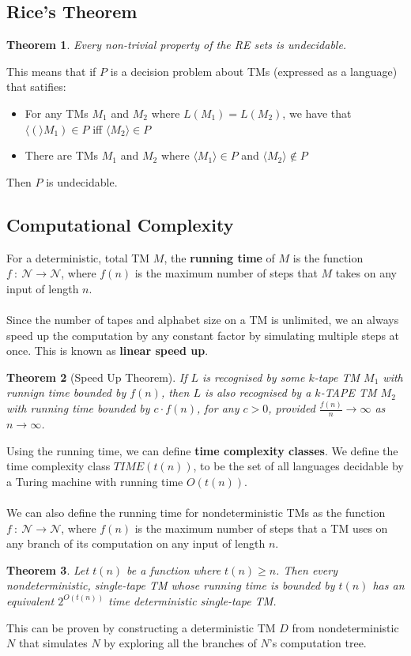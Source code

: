 \documentclass{article}
\newtheorem{thm}{Theorem}
\newcommand{\encode}[1]{\langle #1 \rangle}
\begin{document}
    \subsection{Rice's Theorem}
        \begin{thm}
            Every non-trivial property of the RE sets is undecidable.
        \end{thm}
        This means that if $P$ is a decision problem about TMs (expressed as a language) that satifies:
        \begin{itemize}
            \item For any TMs $M_1$ and $M_2$ where $L(M_1) = L(M_2)$, we have that $\encode(M_1) \in P$ iff $\encode{M_2} \in P$
            \item There are TMs $M_1$ and $M_2$ where $\encode{M_1} \in P$ and $\encode{M_2} \notin P$
        \end{itemize}
        Then $P$ is undecidable.
    \subsection{Computational Complexity}
        For a deterministic, total TM $M$, the \textbf{running time} of $M$ is the function $f \ : \ \mathcal{N} \to \mathcal{N}$, where $f(n)$ is the maximum number of steps that $M$ takes on any input of length $n$.\\ \\
        Since the number of tapes and alphabet size on a TM is unlimited, we an always speed up the computation by any constant factor by simulating multiple steps at once. This is known as \textbf{linear speed up}. 
        \begin{thm}[Speed Up Theorem]
            If $L$ is recognised by some $k$-tape TM $M_1$ with runnign time bounded by $f(n)$, then $L$ is also recognised by a $k$-TAPE TM $M_2$ with running time bounded by $c \cdot f(n)$, for any $c > 0$, provided $\frac{f(n)}{n} \to \infty$ as $n \to \infty$.
        \end{thm}
        Using the running time, we can define \textbf{time complexity classes}. We define the time complexity class $TIME(t(n))$, to be the set of all languages decidable by a Turing machine with running time $O(t(n))$.\\ \\
        We can also define the running time for nondeterministic TMs as the function $f \ : \ \mathcal{N} \to \mathcal{N}$, where $f(n)$ is the maximum number of steps that a TM uses on any branch of its computation on any input of length $n$. 
        \begin{thm}
            Let $t(n)$ be a function  where $t(n) \geq n$. Then every nondeterministic, single-tape TM whose running time is bounded by $t(n)$ has an equivalent $2^{O(t(n))}$ time deterministic single-tape TM. 
        \end{thm}
        This can be proven by constructing a deterministic TM $D$ from nondeterministic $N$ that simulates $N$ by exploring all the branches of $N$'s computation tree. 
\end{document}
